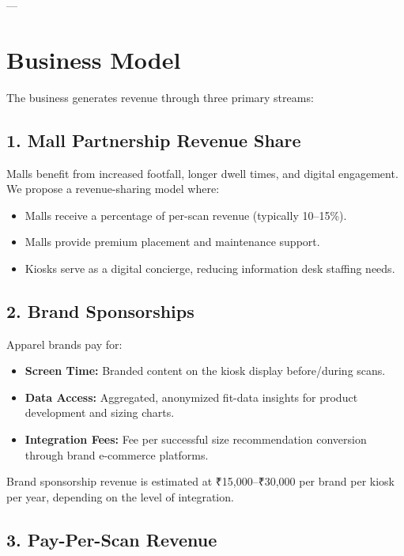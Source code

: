 \documentclass[12pt,a4paper]{article}
\begin{document}
---

\section{Business Model}

The business generates revenue through three primary streams:

\subsection{1. Mall Partnership Revenue Share}

Malls benefit from increased footfall, longer dwell times, and digital engagement. We propose a revenue-sharing model where:

\begin{itemize}
    \item Malls receive a percentage of per-scan revenue (typically 10--15\%).
    \item Malls provide premium placement and maintenance support.
    \item Kiosks serve as a digital concierge, reducing information desk staffing needs.
\end{itemize}

\subsection{2. Brand Sponsorships}

Apparel brands pay for:

\begin{itemize}
    \item \textbf{Screen Time:} Branded content on the kiosk display before/during scans.
    \item \textbf{Data Access:} Aggregated, anonymized fit-data insights for product development and sizing charts.
    \item \textbf{Integration Fees:} Fee per successful size recommendation conversion through brand e-commerce platforms.
\end{itemize}

Brand sponsorship revenue is estimated at ₹15,000--₹30,000 per brand per kiosk per year, depending on the level of integration.

\subsection{3. Pay-Per-Scan Revenue}
\end{document}
